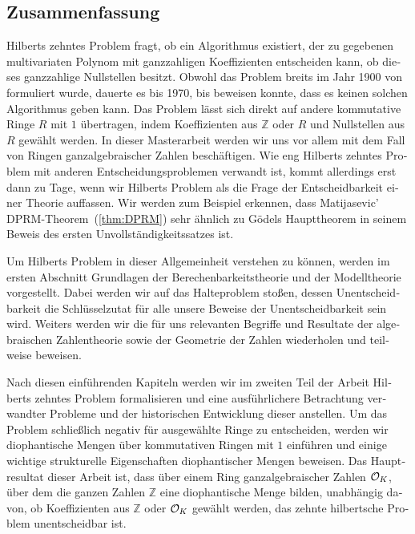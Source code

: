 

\begin{german}
\section{Zusammenfassung}

Hilberts zehntes Problem fragt, ob ein Algorithmus existiert, der zu gegebenen
multivariaten Polynom mit ganzzahligen Koeffizienten entscheiden kann, ob
dieses ganzzahlige Nullstellen besitzt. Obwohl das Problem breits im Jahr 1900
von \textcite{Hilbert1900} formuliert wurde, dauerte es bis 1970, bis
\textcite{Matijasevic1970} beweisen konnte, dass es keinen solchen Algorithmus
geben kann. Das Problem lässt sich direkt auf andere kommutative Ringe \(R\) mit
\(1\) übertragen, indem Koeffizienten aus \(ℤ\) oder \(R\) und Nullstellen aus
\(R\) gewählt werden. In dieser Masterarbeit werden wir uns vor allem mit dem
Fall von Ringen ganzalgebraischer Zahlen beschäftigen. Wie eng Hilberts zehntes
Problem mit anderen Entscheidungsproblemen verwandt ist, kommt allerdings erst
dann zu Tage, wenn wir Hilberts Problem als die Frage der Entscheidbarkeit einer
Theorie auffassen. Wir werden zum Beispiel erkennen, dass Matijasevic'
\textsc{DPRM}-Theorem~(\ref{thm:DPRM}) sehr ähnlich zu Gödels Haupttheorem in
seinem Beweis \cite{Goedel1931} des ersten Unvollständigkeitssatzes ist.

Um Hilberts Problem in dieser Allgemeinheit verstehen zu können, werden im
ersten Abschnitt Grundlagen der Berechenbarkeitstheorie und der Modelltheorie
vorgestellt. Dabei werden wir auf das Halteproblem stoßen, dessen
Unentscheidbarkeit die Schlüsselzutat für alle unsere Beweise der
Unentscheidbarkeit sein wird. Weiters werden wir die für uns relevanten Begriffe
und Resultate der algebraischen Zahlentheorie sowie der Geometrie der Zahlen
wiederholen und teilweise beweisen.

Nach diesen einführenden Kapiteln werden wir im zweiten Teil der Arbeit Hilberts
zehntes Problem formalisieren und eine ausführlichere Betrachtung verwandter
Probleme und der historischen Entwicklung dieser anstellen. Um das Problem
schließlich negativ für ausgewählte Ringe zu entscheiden, werden wir
diophantische Mengen über kommutativen Ringen mit \(1\) einführen und
einige wichtige strukturelle Eigenschaften diophantischer Mengen beweisen. Das
Hauptresultat dieser Arbeit ist, dass über einem Ring ganzalgebraischer
Zahlen \(\mathcal{O}_{K}\), über dem die ganzen Zahlen \(ℤ\) eine diophantische Menge
bilden, unabhängig davon, ob Koeffizienten aus \(ℤ\) oder \(\mathcal{O}_{K}\) gewählt
werden, das zehnte hilbertsche Problem unentscheidbar ist.


\end{german}
